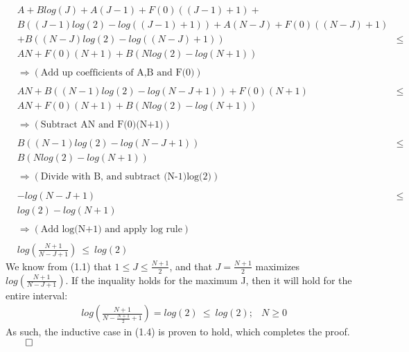 \begin{equation*}	
	\begin{aligned}
	&A + Blog(J) + A(J-1) + F(0)((J-1)+1) +                  & \\
	&B((J-1)log(2)-log((J-1)+1)) + A(N-J) + F(0)((N-J)+1)    & \\
	& + B((N-J)log(2)-log((N-J)+1))                          &\le  \\
	&AN + F(0)(N+1) + B(Nlog(2)-log(N+1))                    & \\
	& & \\
	&\Rightarrow (\text{Add up coefficients of A,B and F(0)})& \\
	& & \\
	&AN + B((N-1)log(2)-log(N-J+1)) + F(0)(N+1)              &\le \\
	&AN + F(0)(N+1) + B(Nlog(2)-log(N+1))                    &  \\	
	& & \\
	&\Rightarrow (\text{Subtract AN and F(0)(N+1)})          & \\
	& & \\	
	&B((N-1)log(2)-log(N-J+1))                               &\le \\
	&B(Nlog(2)-log(N+1))                                     &  \\	
	& & \\
	&\Rightarrow (\text{Divide with B, and subtract (N-1)log(2)})      & \\
	& & \\
	&-log(N-J+1)                                             &\le \\
	&log(2)-log(N+1)                                         &  \\	
	& & \\
	&\Rightarrow (\text{Add log(N+1) and apply log rule})    & \\
	& & \\			
	&log(\frac{N+1}{N-J+1}) \  \le \  log(2)                 & 	
	\end{aligned}
\end{equation*}
We know from (1.1) that $1 \le J \le \frac{N+1}{2}$, and that $J=\frac{N+1}{2}$ maximizes $log(\frac{N+1}{N-J+1})$. If the inquality holds for the maximum J, then it will hold for the entire interval: 
\begin{equation*}	
	\begin{aligned}	
	&log(\frac{N+1}{N-\frac{N+1}{2}+1}) = log(2) \  \le \  log(2);  & N \ge 0 	
	\end{aligned}
\end{equation*}
As such, the inductive case in (1.4) is proven to hold, which completes the proof. $\qed$

